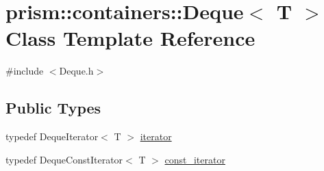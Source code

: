 \hypertarget{classprism_1_1containers_1_1_deque}{}\section{prism\+:\+:containers\+:\+:Deque$<$ T $>$ Class Template Reference}
\label{classprism_1_1containers_1_1_deque}


{\ttfamily \#include $<$Deque.\+h$>$}

\subsection*{Public Types}
\begin{DoxyCompactItemize}
\item 
typedef Deque\+Iterator$<$ T $>$ \hyperlink{classprism_1_1containers_1_1_deque_a684be9c82e48df43905b70432bbc1e68}{iterator}
\item 
typedef Deque\+Const\+Iterator$<$ T $>$ \hyperlink{classprism_1_1containers_1_1_deque_acd441aa1f776dfe56929dfb0449ba73f}{const\+\_\+iterator}
\end{DoxyCompactItemize}

